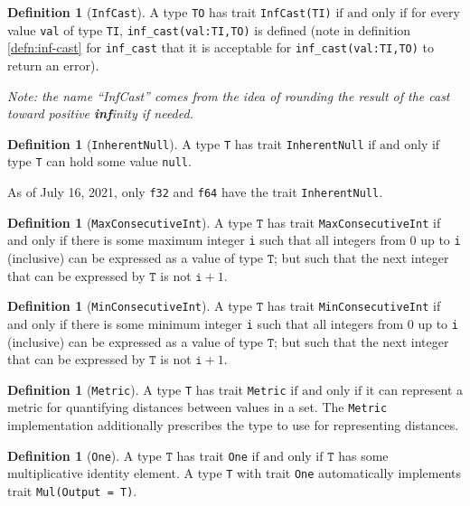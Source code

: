 \documentclass[11pt,a4paper]{article}
\theoremstyle{definition}
\newtheorem{definition}[theorem]{Definition}
\newcommand{\T}{\texttt{T}}
\newcommand{\iffText}{\text{if and only if}}
\begin{document}
\begin{definition}[\texttt{InfCast}]
A type \texttt{TO} has trait \texttt{InfCast(TI)} $\iffText$ for every value \texttt{val} of type \texttt{TI}, \texttt{inf\_cast(val:TI,TO)} is defined (note in definition \ref{defn:inf-cast} for \texttt{inf\_cast} that it is acceptable for \texttt{inf\_cast(val:TI,TO)} to return an error).

\emph{Note: the name ``InfCast'' comes from the idea of rounding the result of the cast toward positive \textbf{inf}inity if needed.}
\end{definition}

\begin{definition}[\texttt{InherentNull}]
A type \texttt{T} has trait \texttt{InherentNull} $\iffText$ type \texttt{T} can hold some value \texttt{null}.

As of July 16, 2021, only \texttt{f32} and \texttt{f64} have the trait \texttt{InherentNull}.
\end{definition}


\begin{definition}[\texttt{MaxConsecutiveInt}]
A type $\T$ has trait \texttt{MaxConsecutiveInt} if and only if there is some maximum integer \texttt{i} such that all integers from 0 up to \texttt{i} (inclusive) can be expressed as a value of type $\T$; but such that the next integer that can be expressed by $\T$ is not $\texttt{i}+1$.
\end{definition}

\begin{definition}[\texttt{MinConsecutiveInt}]
A type $\T$ has trait \texttt{MinConsecutiveInt} if and only if there is some minimum integer \texttt{i} such that all integers from 0 up to \texttt{i} (inclusive) can be expressed as a value of type $\T$; but such that the next integer that can be expressed by $\T$ is not $\texttt{i}+1$.
\end{definition}

\begin{definition}[\texttt{Metric}]
A type \texttt{T} has trait \texttt{Metric} $\iffText$ it can represent a metric for quantifying distances between values in a set. The \texttt{Metric} implementation additionally prescribes the type to use for representing distances.
\end{definition}

\begin{definition}[\texttt{One}]
    A type $\T$ has trait \texttt{One} $\iffText$ $\T$ has some multiplicative identity element. A type \texttt{T} with trait \texttt{One} automatically implements trait \texttt{Mul(Output = T)}.
\end{definition}
\end{document}
